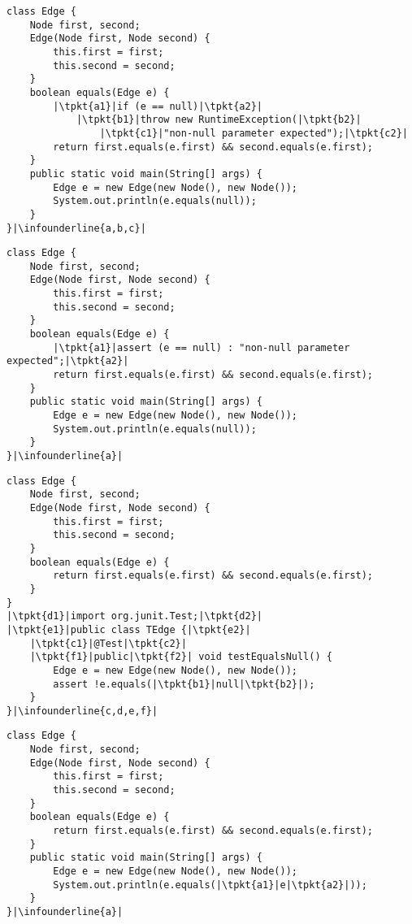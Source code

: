 \begin{lrbox}{}
	\begin{lstlisting}
class Edge {
	Node first, second;
	Edge(Node first, Node second) {
		this.first = first;
		this.second = second;
	}
	boolean equals(Edge e) {
		|\tpkt{a1}|if (e == null)|\tpkt{a2}|
			|\tpkt{b1}|throw new RuntimeException(|\tpkt{b2}|
				|\tpkt{c1}|"non-null parameter expected");|\tpkt{c2}|
		return first.equals(e.first) && second.equals(e.first);
	}
	public static void main(String[] args) {
		Edge e = new Edge(new Node(), new Node());
		System.out.println(e.equals(null));
	}
}|\infounderline{a,b,c}|
	\end{lstlisting}
\end{lrbox}

\newsavebox{\runtimeassertions}
\begin{lrbox}{\runtimeassertions}
	\begin{lstlisting}
class Edge {
	Node first, second;
	Edge(Node first, Node second) {
		this.first = first;
		this.second = second;
	}
	boolean equals(Edge e) {
		|\tpkt{a1}|assert (e == null) : "non-null parameter expected";|\tpkt{a2}|
		return first.equals(e.first) && second.equals(e.first);
	}
	public static void main(String[] args) {
		Edge e = new Edge(new Node(), new Node());
		System.out.println(e.equals(null));
	}
}|\infounderline{a}|
	\end{lstlisting}
\end{lrbox}

\newsavebox{\unittests}
\begin{lrbox}{\unittests}
	\begin{lstlisting}
class Edge {
	Node first, second;
	Edge(Node first, Node second) {
		this.first = first;
		this.second = second;
	}
	boolean equals(Edge e) {
		return first.equals(e.first) && second.equals(e.first);
	}
}
|\tpkt{d1}|import org.junit.Test;|\tpkt{d2}|
|\tpkt{e1}|public class TEdge {|\tpkt{e2}|
	|\tpkt{c1}|@Test|\tpkt{c2}|
	|\tpkt{f1}|public|\tpkt{f2}| void testEqualsNull() {
		Edge e = new Edge(new Node(), new Node());
		assert !e.equals(|\tpkt{b1}|null|\tpkt{b2}|);
	}
}|\infounderline{c,d,e,f}|
	\end{lstlisting}
\end{lrbox}

\newsavebox{\edgeruntimeerrorfix}
\begin{lrbox}{\edgeruntimeerrorfix}
	\begin{lstlisting}
class Edge {
	Node first, second;
	Edge(Node first, Node second) {
		this.first = first;
		this.second = second;
	}
	boolean equals(Edge e) {
		return first.equals(e.first) && second.equals(e.first);
	}
	public static void main(String[] args) {
		Edge e = new Edge(new Node(), new Node());
		System.out.println(e.equals(|\tpkt{a1}|e|\tpkt{a2}|));
	}
}|\infounderline{a}|
	\end{lstlisting}
\end{lrbox}

